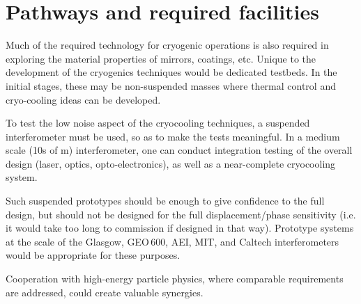 %


\section{Pathways and required facilities}
Much of the required technology for cryogenic operations is also required
in exploring the material properties of mirrors, coatings, etc.
Unique to the development of the cryogenics techniques would be dedicated
testbeds. In the initial stages, these may be non-suspended masses where
thermal control and cryo-cooling ideas can be developed.

To test the low noise aspect of the cryocooling techniques, a suspended
interferometer must be used, so as to make the tests meaningful. In a
medium scale (10s of m) interferometer, one can conduct integration testing
of the overall design (laser, optics, opto-electronics), as well as a
near-complete cryocooling system.

Such suspended prototypes should be enough to give confidence to the full design,
but should not be designed for the full displacement/phase sensitivity
(i.e. it would take too long to commission if designed in that way).
Prototype systems at the scale of the Glasgow, GEO\,600, AEI, MIT, and Caltech interferometers
would be appropriate for these purposes. 

Cooperation with high-energy particle physics, where comparable requirements are addressed, could create valuable synergies.



